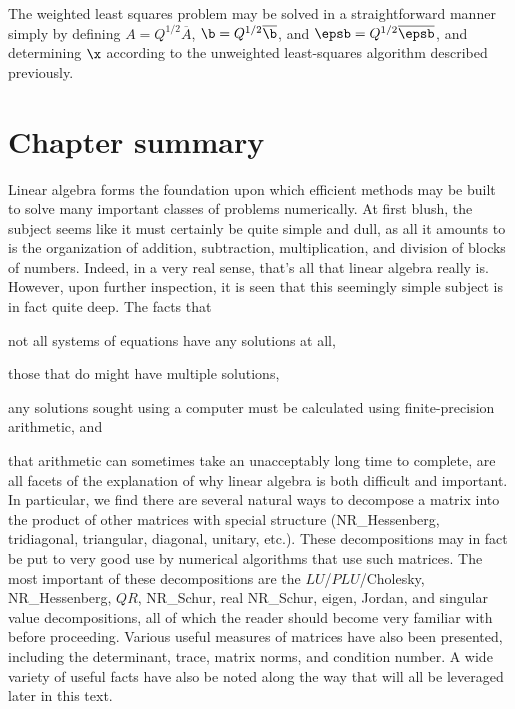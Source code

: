 The weighted least squares problem may be solved in a straightforward
manner simply by defining $A=Q^{1/2} \overline{A}$, $\b=Q^{1/2}
\overline{\b}$, and $\epsb=Q^{1/2} \overline{\epsb}$, and determining
$\x$ according to the unweighted least-squares algorithm
described previously.

%
%
%
%

\section{Chapter summary}

Linear algebra forms the foundation upon which efficient methods may
be built to solve many important classes of problems numerically.  
At first blush, the subject seems like it must certainly be quite simple and dull, as all it amounts to is
the organization of addition, subtraction, multiplication, and division of blocks
of numbers.  Indeed, in a very real sense, that's all that linear algebra really is.
However, upon further inspection, it is seen that this seemingly simple subject is in fact quite
deep.  The facts that
\beginmylistb
\item not all systems of equations have any solutions at all,
\item those that do might have multiple solutions,
\item any solutions sought using a computer must be calculated using finite-precision arithmetic, and
\item that arithmetic can sometimes take an unacceptably long time to complete,
\endmylist
\noindent are all facets of the explanation of why linear algebra is both difficult and important.  In particular,
we find there are several natural ways to decompose a matrix into the product of other matrices with
special structure (NR_Hessenberg, tridiagonal, triangular, diagonal, unitary, etc.).  These decompositions
may in fact be put to very good use by numerical algorithms that use such matrices.  The most
important of these decompositions are the $LU$/$PLU$/Cholesky, NR_Hessenberg, $QR$, NR_Schur, real NR_Schur, eigen,
Jordan, and singular value decompositions, all of which the reader should become very familiar with before proceeding.  
Various useful measures of matrices have also been presented, including the determinant, trace, matrix norms,
and condition number. A wide variety of useful facts have also be noted along the way that will all be leveraged later in this text.

